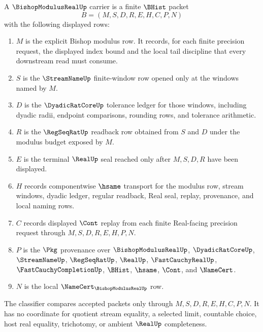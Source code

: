 \begin{definition}
\label{def:bishop-modulus-real-carrier}
A $\BishopModulusRealUp$ carrier is a finite $\BHist$ packet
$$
B=(M,S,D,R,E,H,C,P,N)
$$
with the following displayed rows:
\begin{enumerate}
\item $M$ is the explicit Bishop modulus row. It records, for each finite precision request, the displayed index bound and the local tail discipline that every downstream read must consume.
\item $S$ is the $\StreamNameUp$ finite-window row opened only at the windows named by $M$.
\item $D$ is the $\DyadicRatCoreUp$ tolerance ledger for those windows, including dyadic radii, endpoint comparisons, rounding rows, and tolerance arithmetic.
\item $R$ is the $\RegSeqRatUp$ readback row obtained from $S$ and $D$ under the modulus budget exposed by $M$.
\item $E$ is the terminal $\RealUp$ seal reached only after $M,S,D,R$ have been displayed.
\item $H$ records componentwise $\hsame$ transport for the modulus row, stream windows, dyadic ledger, regular readback, Real seal, replay, provenance, and local naming rows.
\item $C$ records displayed $\Cont$ replay from each finite Real-facing precision request through $M,S,D,R,E,H,P,N$.
\item $P$ is the $\Pkg$ provenance over $\BishopModulusRealUp$, $\DyadicRatCoreUp$, $\StreamNameUp$, $\RegSeqRatUp$, $\RealUp$, $\FastCauchyRealUp$, $\FastCauchyCompletionUp$, $\BHist$, $\hsame$, $\Cont$, and $\NameCert$.
\item $N$ is the local $\NameCert_{\BishopModulusRealUp}$ row.
\end{enumerate}
The classifier compares accepted packets only through $M,S,D,R,E,H,C,P,N$. It has no coordinate for quotient stream equality, a selected limit, countable choice, host real equality, trichotomy, or ambient $\RealUp$ completeness.
\end{definition}

